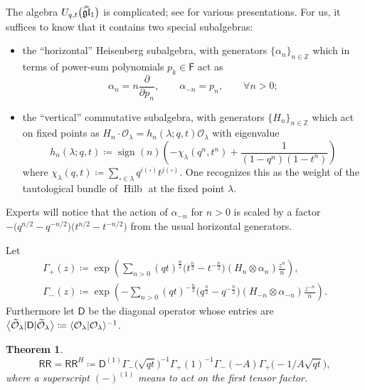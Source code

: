 \documentclass[10pt,a4paper]{amsart}
\numberwithin{equation}{section}
\newtheorem{Theorem}{Theorem}[section]
\renewcommand{\hat}[1]{\widehat{#1}}
\newcommand{\hhat}[1]{\hat{\vphantom{\rule{1pt}{5.5pt}}\smash{\hat{#1}}}}
\renewcommand{\tilde}[1]{\widetilde{#1}}
\newcommand{\lie}[1]{\mathfrak{#1}}
\newcommand{\bZ}{\mathbb{Z}}
\newcommand{\cO}{\mathcal{O}}
\newcommand{\sD}{\mathsf{D}}
\newcommand{\sF}{\mathsf{F}}
\newcommand{\sRR}{\mathsf{RR}}
\newcommand{\di}{\partial}
\DeclareMathOperator{\sign}{sign}
\DeclareMathOperator{\Hilb}{Hilb}
\DeclarePairedDelimiter{\inner}{\langle}{\rangle}
\begin{document}
\begin{MyParagraph}\label{sec:quantum-toroidal-gl1-details}
The algebra $U_{q,t}\big(\hhat{\lie{gl}}_1\big)$ is complicated; see
\cite{Schiffmann2012} for various presentations. For us, it suffices
to know that it contains two special subalgebras:
\begin{itemize}\itemsep=0pt
\item the ``horizontal'' Heisenberg subalgebra, with generators
 $\{\alpha_n\}_{n \in \bZ}$ which in terms of power-sum polynomials
 $p_k \in \sF$ act as
 \[ \alpha_n = n\frac{\di}{\di p_n}, \qquad \alpha_{-n} = p_n, \qquad \forall n > 0; \]
\item the ``vertical'' commutative subalgebra, with generators
 $\{H_n\}_{n \in \bZ}$ which act on fixed points as $H_n \cdot \cO_\lambda
 = h_n(\lambda;q,t) \cO_\lambda$ with eigenvalue
 \begin{equation} \label{eq:tautological-weight-hilb}
 h_n(\lambda;q,t) \coloneqq \sign(n) \left(-\chi_\lambda(q^n, t^n) + \frac{1}{(1 - q^n)(1 - t^n)}\right)
 \end{equation}
 where
 $\chi_{\lambda}(q,t) \coloneqq \sum_{\square \in \lambda} q^{i(\square)} t^{j(\square)}$.
 One recognizes this as the weight of the tautological bundle of
 $\Hilb$ at the fixed point $\lambda$.
\end{itemize}
Experts will notice that the action of $\alpha_{-n}$ for $n > 0$ is
scaled by a factor $-\big(q^{n/2}-q^{-n/2}\big)\big(t^{n/2}-t^{-n/2}\big)$ from the
usual horizontal generators.
\end{MyParagraph}

\begin{MyParagraph}
Let
\begin{gather}
 \Gamma_+(z) \coloneqq \exp\left(\sum_{n>0} (qt)^{\frac{n}{2}} \big(t^{\frac{n}{2}} - t^{-\frac{n}{2}}\big) (H_n \otimes \alpha_n) \frac{z^n}{n}\right),\nonumber \\
 \Gamma_-(z) \coloneqq \exp\left(-\sum_{n>0} (qt)^{-\frac{n}{2}} \big(q^{\frac{n}{2}} - q^{-\frac{n}{2}}\big) (H_{-n} \otimes \alpha_{-n}) \frac{z^{-n}}{n}\right).\label{eq:gamma-vertex-operators}
 \end{gather}
Furthermore let $\sD$ be the diagonal operator whose entries are
$\big\langle \tilde\cO_\lambda | \sD | \tilde\cO_\lambda\big\rangle \coloneqq
\inner{\cO_\lambda | \cO_\lambda}^{-1}$.


\begin{Theorem} \label{thm:instanton-four-point-adjoint-as-horizontal-operator}
 \begin{equation} \label{eq:instanton-four-point-horizontal-operator-formula}
 \sRR = \sRR^H \coloneqq \sD^{(1)} \Gamma_-\big(\sqrt{qt}\big)^{-1} \Gamma_+ (1 )^{-1} \Gamma_- (-A ) \Gamma_+\big({-}1/A\sqrt{qt}\big),
 \end{equation}
 where a superscript $(-)^{(1)}$ means to act on the first tensor
 factor.
\end{Theorem}

\end{MyParagraph}
\end{document}
